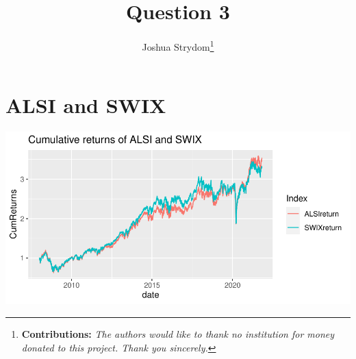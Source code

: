 \documentclass[11pt,preprint, authoryear]{elsarticle}
\let\origfigure\figure
\let\endorigfigure\endfigure
\renewenvironment{figure}[1][2] {
    \expandafter\origfigure\expandafter[H]
} {
    \endorigfigure
}
\numberwithin{equation}{section}
\numberwithin{figure}{section}
\numberwithin{table}{section}
\let\rmarkdownfootnote\footnote%
\def\footnote{\protect\rmarkdownfootnote}
\begin{document}
\begin{frontmatter}  %

\title{Question 3}





\author[Add1]{Joshua Strydom\footnote{\textbf{Contributions:}
  \newline \emph{The authors would like to thank no institution for
  money donated to this project. Thank you sincerely.}}}





\address[Add1]{Stellenbosch University, Stellenbosch, South Africa}



\vspace{1cm}





\vspace{0.5cm}

\end{frontmatter}



\pagestyle{fancy}
\chead{}
\rhead{}
\lfoot{}
\lhead{}
\cfoot{}


\headsep 35pt %




\hypertarget{alsi-and-swix}{%
\section{\texorpdfstring{ALSI and SWIX
\label{ALSISWIX}}{ALSI and SWIX }}\label{alsi-and-swix}}

\begin{figure}[H]

{\centering \includegraphics{Question3_files/figure-latex/Figure1-1} 

}

\caption{Cumulative returns \label{Figure1}}\label{fig:Figure1}
\end{figure}
\end{document}
